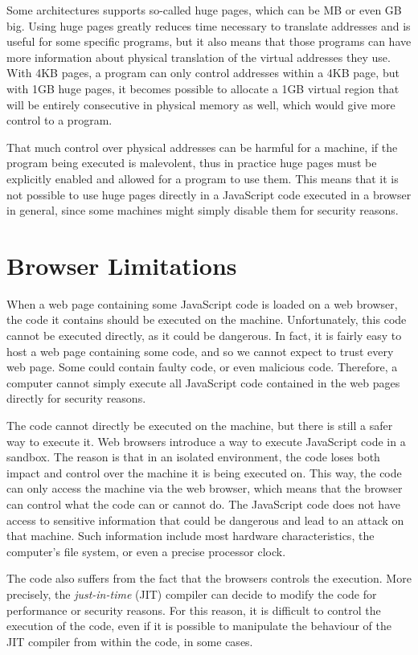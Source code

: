 \documentclass[a4paper,11pt,oneside]{report}
\begin{document}
Some architectures supports so-called huge pages, which can be MB or even GB big. Using huge pages greatly reduces time necessary to translate addresses and is useful for some specific programs, but it also means that those programs can have more information about physical translation of the virtual addresses they use. With 4KB pages, a program can only control addresses within a 4KB page, but with 1GB huge pages, it becomes possible to allocate a 1GB virtual region that will be entirely consecutive in physical memory as well, which would give more control to a program. 

That much control over physical addresses can be harmful for a machine, if the program being executed is malevolent, thus in practice huge pages must be explicitly enabled and allowed for a program to use them. This means that it is not possible to use huge pages directly in a JavaScript code executed in a browser in general, since some machines might simply disable them for security reasons.

\section{Browser Limitations}

When a web page containing some JavaScript code is loaded on a web browser, the code it contains should be executed on the machine. Unfortunately, this code cannot be executed directly, as it could be dangerous. In fact, it is fairly easy to host a web page containing some code, and so we cannot expect to trust every web page. Some could contain faulty code, or even malicious code. Therefore, a computer cannot simply execute all JavaScript code contained in the web pages directly for security reasons.

The code cannot directly be executed on the machine, but there is still a safer way to execute it. Web browsers introduce a way to execute JavaScript code in a sandbox. The reason is that in an isolated environment, the code loses both impact and control over the machine it is being executed on. This way, the code can only access the machine via the web browser, which means that the browser can control what the code can or cannot do. The JavaScript code does not have access to sensitive information that could be dangerous and lead to an attack on that machine. Such information include most hardware characteristics, the computer's file system, or even a precise processor clock. 

The code also suffers from the fact that the browsers controls the execution. More precisely, the \emph{just-in-time} (JIT) compiler can decide to modify the code for performance or security reasons. For this reason, it is difficult to control the execution of the code, even if it is possible to manipulate the behaviour of the JIT compiler from within the code, in some cases. 
\end{document}
